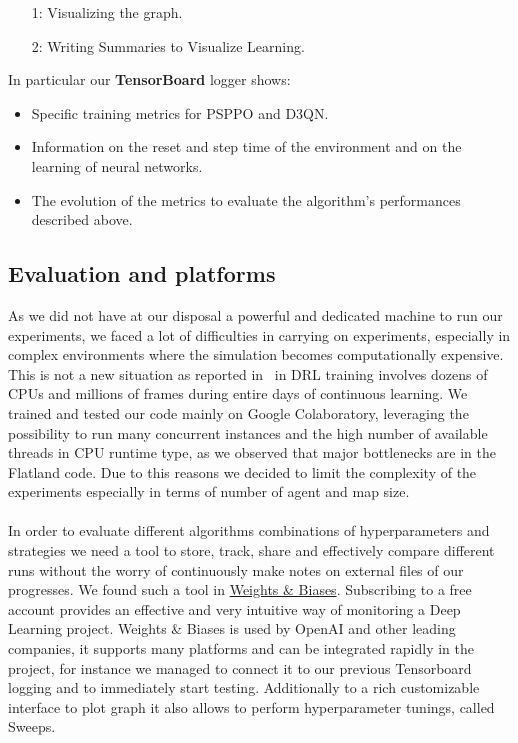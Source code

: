\documentclass[11pt, a4paper, hidelinks]{report}
\begin{document}
\begin{enumerate}
\item [1:]Visualizing the graph.
\item [2:]Writing Summaries to Visualize Learning.
\end{enumerate}

In particular our \textbf{TensorBoard} logger shows:

\begin{itemize}
	\item Specific training metrics for PSPPO and D3QN.
	\item Information on the reset and step time of the environment and on the learning of neural networks.
	\item The evolution of the metrics to evaluate the algorithm's performances described above.
\end{itemize}

\subsection{Evaluation and platforms}\label{subsec:evaluation-and-platforms}

As we did not have at our disposal a powerful and dedicated machine to run our experiments, we faced a lot of difficulties in carrying on experiments, especially in complex environments where the simulation becomes computationally expensive.
This is not a new situation as reported in~\citep{Hernandez-Leal-2019} in DRL training involves dozens of CPUs and millions of frames during entire days of continuous learning.
We trained and tested our code mainly on Google Colaboratory, leveraging the possibility to run many concurrent instances and the high number of available threads in CPU runtime type, as we observed that major bottlenecks are in the Flatland code.
Due to this reasons we decided to limit the complexity of the experiments especially in terms of number of agent and map size.\\%
\\
In order to evaluate different algorithms combinations of hyperparameters and strategies we need a tool to store, track, share and effectively compare different runs without the worry of continuously make notes on external files of our progresses.
We found such a tool in \href{https://www.wandb.com/}{Weights \& Biases}.
Subscribing to a free account provides an effective and very intuitive way of monitoring a Deep Learning project.
Weights \& Biases is used by OpenAI and other leading companies, it supports many platforms and can be integrated rapidly in the project, for instance we managed to connect it to our previous Tensorboard logging and to immediately start testing.
Additionally to a rich customizable interface to plot graph it also allows to perform hyperparameter tunings, called Sweeps.
\end{document}
